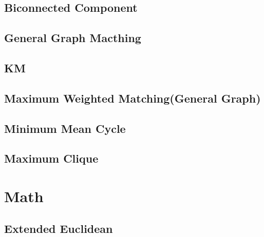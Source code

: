 \documentclass[a4paper,10pt,twocolumn,oneside]{article}
\begin{document}
\subsection{Biconnected Component}


\subsection{General Graph Macthing}


\subsection{KM}


\subsection{Maximum Weighted Matching(General Graph)}


\subsection{Minimum Mean Cycle}


\subsection{Maximum Clique}


%

%

\section{Math}

\subsection{Extended Euclidean}

\end{document}
